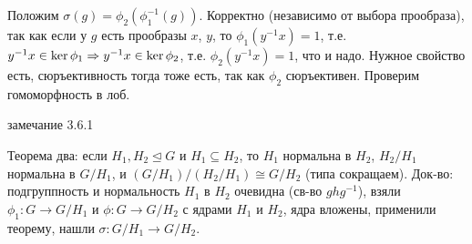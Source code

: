 Положим $\sigma(g) = \phi_2(\phi_1^{-1}(g))$.
Корректно (независимо от выбора прообраза), так как если у $g$ есть прообразы $x$, $y$,
то $\phi_1(y^{-1}x)=1$, т.е. $y^{-1}x \in \ker \phi_1 \Rightarrow y^{-1}x \in \ker \phi_2$,
т.е. $\phi_2(y^{-1}x)=1$, что и надо.
Нужное свойство есть, сюръективность тогда тоже есть, так как $\phi_2$ сюръективен.
Проверим гомоморфность в лоб.

\TODO замечание 3.6.1

Теорема два: если $H_1, H_2 \unlhd G$ и $H_1 \subseteq H_2$, то	$H_1$ нормальна в $H_2$,
$H_2 / H_1$ нормальна в $G/H_1$, и $(G/H_1)/(H_2/H_1)\cong G/H_2$ (типа сокращаем).
Док-во: подгруппность и нормальность $H_1$ в $H_2$ очевидна (св-во $ghg^{-1}$),
взяли $\phi_1 \colon G \to G/H_1$ и $\phi \colon G \to G/H_2$ с ядрами $H_1$ и $H_2$,
ядра вложены, применили теорему, нашли $\sigma \colon G/H_1 \to G/H_2$.
